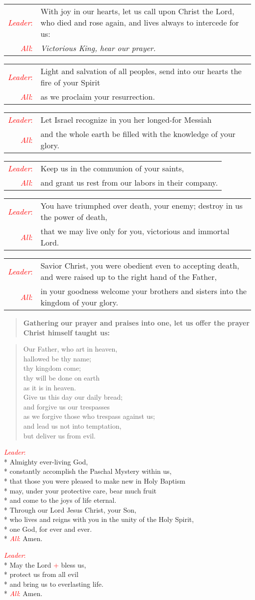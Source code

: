\documentclass[letterpaper,14pt]{extarticle}
\newcommand{\side}[1]{\flagverse{\textcolor{red}{\textit{#1}}:}}
\newcommand{\sidestar}[1]{\textcolor{red}{\textit{#1}:}}
\newcommand{\rednote}[1]{\textcolor{red}{#1}}
\newlength{\oldindent}
\newcommand{\antiphon}[2]{
	\setlength{\oldindent}{\vindent}
	\setlength{\vindent}{0em}
	\begin{verse}
	\side{#1} \textbf{#2}
	\end{verse}
	\setlength{\vindent}{\oldindent}
}
\newcommand{\intercession}[2]{
	\begin{tabular}[h]{r p{4.25in}}
		\sidestar{Leader} & #1 \\
		\sidestar{All} & #2
	\end{tabular}}
\begin{document}
\intercession{With joy in our hearts, let us call upon Christ the Lord, who
died and rose again, and lives always to intercede for us:}
{\textit{Victorious King, hear our prayer.}}

\intercession{Light and salvation of all peoples, send into our hearts the fire of your Spirit}{as we proclaim your resurrection.}

\intercession{Let Israel recognize in you her longed-for Messiah}
{and the whole earth be filled with the knowledge of your glory.}

\intercession{Keep us in the communion of your saints,}
{and grant us rest from our labors in their company.}

\intercession{You have triumphed over death, your enemy; destroy in us the
power of death,}
{that we may live only for you, victorious and immortal Lord.}

\intercession{Savior Christ, you were obedient even to accepting death, and
were raised up to the right hand of the Father,}
{in your goodness welcome your brothers and sisters into the
kingdom of your glory.}

\antiphon{Leader}{Gathering our prayer and praises into one, let us offer the
prayer Christ himself taught us:}
\begin{verse}
\side{All} Our Father, who art in heaven, \\
hallowed be thy name; \\
thy kingdom come; \\
thy will be done on earth \\
as it is in heaven. \\
Give us this day our daily bread; \\
and forgive us our trespasses \\
as we forgive those who trespass against us; \\
and lead us not into temptation, \\
but deliver us from evil.
\end{verse}

\sidestar{Leader}\\*
Almighty ever-living God, \\*
constantly accomplish the Paschal Mystery within us, \\*
that those you were pleased to make new in Holy Baptism \\*
may, under your protective care, bear much fruit \\*
and come to the joys of life eternal. \\*
Through our Lord Jesus Christ, your Son, \\*
who lives and reigns with you in the unity of the Holy Spirit, \\*
one God, for ever and ever. \\*
\sidestar{All} Amen.


\sidestar{Leader}\\*
May the Lord \rednote{+} bless us, \\*
protect us from all evil \\*
and bring us to everlasting life. \\*
\sidestar{All} Amen.
\end{document}
